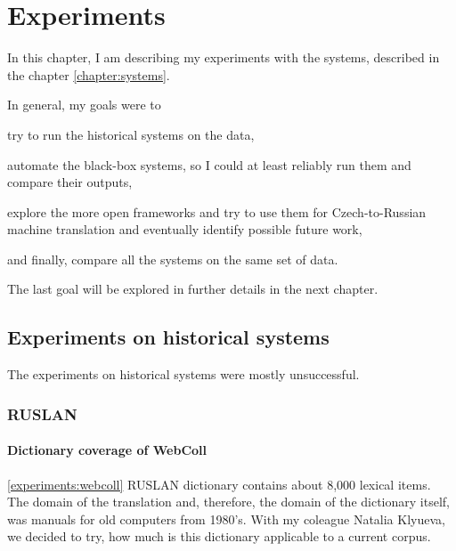 \chapter{Experiments}
\label{chapter:experiments}
In this chapter, I am describing my experiments with the systems, described in the chapter \ref{chapter:systems}.

In general, my goals were to 
\begin{pitemize}
\item try to run the historical systems on the data,
\item automate the black-box systems, so I could at least reliably run them and compare their outputs,
\item explore the more open frameworks and try to use them for Czech-to-Russian machine translation and eventually identify possible future work,
\item and finally, compare all the systems on the same set of data.
\end{pitemize}

The last goal will be explored in further details in the next chapter.

\section{Experiments on historical systems}
The experiments on historical systems were mostly unsuccessful.

\subsection{RUSLAN}
\subsubsection{Dictionary coverage of WebColl}
\ref{experiments:webcoll}
RUSLAN dictionary contains about 8,000 lexical items. The domain of the translation and, therefore, the domain of the dictionary itself, was manuals for old computers from 1980's. 
With my coleague Natalia Klyueva, we decided to try, how much is this dictionary applicable to a current corpus.

